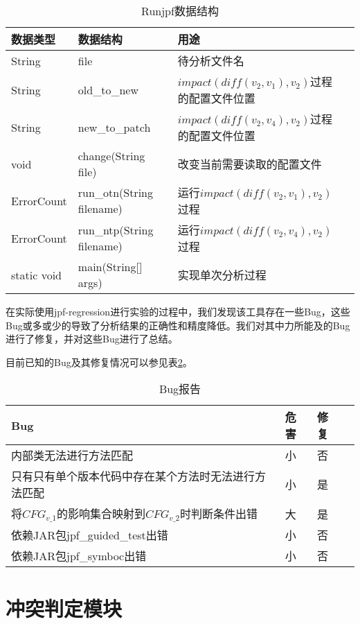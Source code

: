 \begin{table}
	\caption{Runjpf数据结构}
	\label{run_jpf_data}
	\centering
	\begin{tabular}{lllc}
		\toprule[1.5pt]
		{\heiti 数据类型} &{\heiti 数据结构} & {\heiti 用途} \\\midrule[1pt]
		String & file & 待分析文件名\\
		String & old\_to\_new & $impact(diff(v_2,v_1),v_2)$过程的配置文件位置\\
		String & new\_to\_patch & $impact(diff(v_2,v_4),v_2)$过程的配置文件位置\\
		void & change(String file) & 改变当前需要读取的配置文件\\
		ErrorCount & run\_otn(String filename) & 运行$impact(diff(v_2,v_1),v_2)$过程 \\
		ErrorCount & run\_ntp(String filename) & 运行$impact(diff(v_2,v_4),v_2)$过程  \\
		static void & main(String[] args) & 实现单次分析过程\\
		\bottomrule[1.5pt]
	\end{tabular}
\end{table}


在实际使用jpf-regression进行实验的过程中，我们发现该工具存在一些Bug，这些Bug或多或少的导致了分析结果的正确性和精度降低。我们对其中力所能及的Bug进行了修复，并对这些Bug进行了总结。

目前已知的Bug及其修复情况可以参见表\ref {bug_data}。

\begin{table}
	\caption{Bug报告}
	\label{bug_data}
	\centering
	\begin{tabular}{lllc}
		\toprule[1.5pt]
		{\heiti Bug} &{\heiti 危害} & {\heiti 修复} \\\midrule[1pt]
		内部类无法进行方法匹配 & 小 & 否\\
		只有只有单个版本代码中存在某个方法时无法进行方法匹配 & 小 & 是\\
		将$CFG_{v\_1}$的影响集合映射到$CFG_{v\_2}$时判断条件出错 & 大 & 是\\
		依赖JAR包jpf\_guided\_test出错 & 小 & 否\\
		依赖JAR包jpf\_symboc出错 & 小 & 否\\
		\bottomrule[1.5pt]
	\end{tabular}
\end{table}

\section{冲突判定模块}
\label {tool_conflict}

